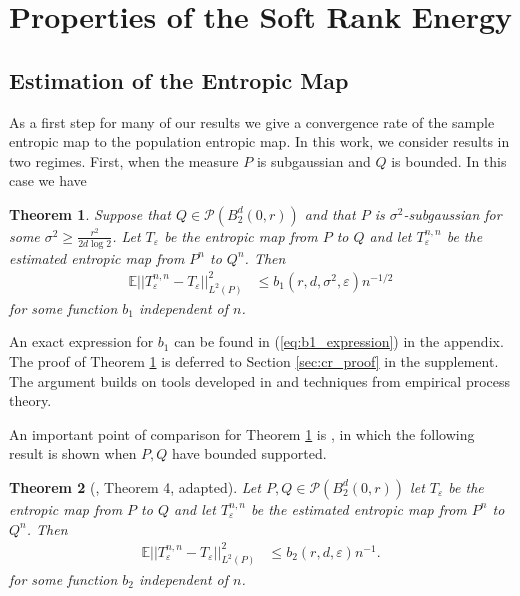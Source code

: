 \documentclass{article}
\newtheorem{theorem}{Theorem}
\theoremstyle{definition}
\newcommand{\Teps}{T_\varepsilon}
\begin{document}
\section{Properties of the Soft Rank Energy} \label{sec:properties}

\subsection{Estimation of the Entropic Map}

As a first step for many of our results we give a convergence rate of the sample entropic map to the population entropic map.  In this work, we consider results in two regimes. First, when the measure $P$ is subgaussian and $Q$ is bounded. In this case we have

\begin{theorem} \label{thm:subg_conv_rate}
    Suppose that  $Q \in \mathcal{P}(B_2^d(0,r))$ and that $P$ is $\sigma^2$-subgaussian for some $\sigma^2 \geq \frac{r^2}{2d \log 2}$. Let $\Teps$ be the entropic map from $P$ to $Q$ and let $\Teps^{n,n}$ be the estimated entropic map from $P^n$ to $Q^n$. Then 
    \begin{align*}
        \mathbb{E}||\Teps^{n,n} - \Teps||_{L^2(P)}^2 &\leq b_1(r,d,\sigma^2, \varepsilon) n^{-1/2}
    \end{align*}
    for some function $b_1$ independent of $n$.
\end{theorem}
An exact expression for $b_1$ can be found in (\ref{eq:b1_expression}) in the appendix.  The proof of Theorem \ref{thm:subg_conv_rate} is deferred to Section \ref{sec:cr_proof} in the supplement. The argument builds on tools developed in \cite{pooladian2021entropic} and techniques from empirical process theory. 

An important point of comparison for Theorem \ref{thm:subg_conv_rate} is \cite{rigollet2022sample}, in which the following result is shown when $P,Q$ have bounded supported.
\begin{theorem}[\cite{rigollet2022sample}, Theorem 4, adapted] \label{thm:bounded_conv_rate}
    Let  $P,Q \in \mathcal{P}(B_2^d(0,r))$ let $\Teps$ be the entropic map from $P$ to $Q$ and let $\Teps^{n,n}$ be the estimated entropic map from $P^n$ to $Q^n$. Then 
    \begin{align*}
        \mathbb{E}||\Teps^{n,n} - \Teps||_{L^2(P)}^2 &\leq b_2(r,d,\varepsilon) n^{-1}.
    \end{align*}
    for some function $b_2$ independent of $n$.
\end{theorem}
\end{document}

